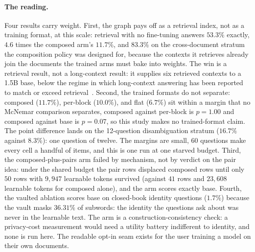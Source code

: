 \documentclass{article}
\begin{document}
\paragraph{The reading.}
Four results carry weight. First, the graph pays off as a retrieval index, not as a training format, at this scale: retrieval with no fine-tuning answers $53.3\%$ exactly, $4.6$ times the composed arm's $11.7\%$, and $83.3\%$ on the cross-document stratum the composition policy was designed for, because the contexts it retrieves already join the documents the trained arms must bake into weights. The win is a retrieval result, not a long-context result: it supplies six retrieved contexts to a 1.5B base, below the regime in which long-context answering has been reported to match or exceed retrieval~\cite{li2024raglc}. Second, the trained formats do not separate: composed ($11.7\%$), per-block ($10.0\%$), and flat ($6.7\%$) sit within a margin that no McNemar comparison separates, composed against per-block is $p{=}1.00$ and composed against base is $p{=}0.07$, so this study makes no trained-format claim. The point difference lands on the 12-question disambiguation stratum ($16.7\%$ against $8.3\%$): one question of twelve. The margins are small, 60 questions make every cell a handful of items, and this is one run at one starved budget. Third, the composed-plus-pairs arm failed by mechanism, not by verdict on the pair idea: under the shared budget the pair rows displaced composed rows until only $50$ rows with $9{,}947$ learnable tokens survived (against $41$ rows and $23{,}608$ learnable tokens for composed alone), and the arm scores exactly base. Fourth, the vaulted ablation scores base on closed-book identity questions ($1.7\%$) because the vault masks $36.31\%$ of subwords: the identity the questions ask about was never in the learnable text. The arm is a construction-consistency check: a privacy-cost measurement would need a utility battery indifferent to identity, and none is run here. The readable opt-in seam exists for the user training a model on their own documents.
\end{document}
